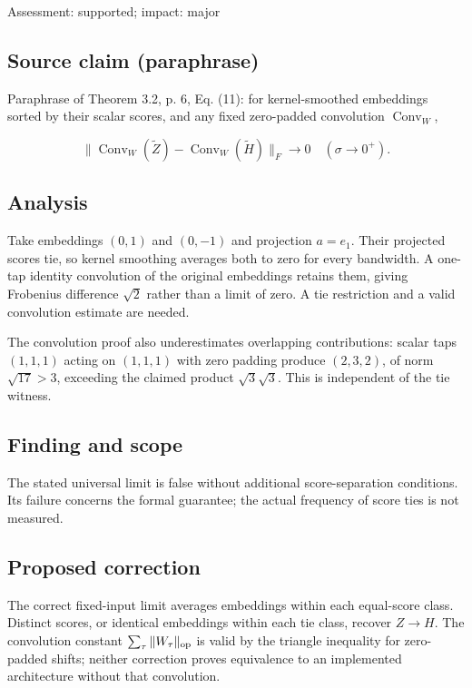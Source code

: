 \documentclass[11pt]{article}
\begin{document}
Assessment: supported; impact: major

\subsection*{Source claim (paraphrase)}

Paraphrase of Theorem 3.2, p. 6, Eq. (11): for kernel-smoothed embeddings sorted by their scalar scores, and any fixed zero-padded convolution \(\operatorname{Conv}_W\),

\[ \|\operatorname{Conv}_W(\widetilde Z)-\operatorname{Conv}_W(\widetilde H)\|_F\to0 \quad(\sigma\to0^+). \]

\subsection*{Analysis}

Take embeddings \((0,1)\) and \((0,-1)\) and projection \(a=e_1\). Their projected scores tie, so kernel smoothing averages both to zero for every bandwidth. A one-tap identity convolution of the original embeddings retains them, giving Frobenius difference \(\sqrt2\) rather than a limit of zero. A tie restriction and a valid convolution estimate are needed.

The convolution proof also underestimates overlapping contributions: scalar taps \((1,1,1)\) acting on \((1,1,1)\) with zero padding produce \((2,3,2)\), of norm \(\sqrt{17}>3\), exceeding the claimed product \(\sqrt3\sqrt3\). This is independent of the tie witness.

\subsection*{Finding and scope}

The stated universal limit is false without additional score-separation conditions. Its failure concerns the formal guarantee; the actual frequency of score ties is not measured.

\subsection*{Proposed correction}

The correct fixed-input limit averages embeddings within each equal-score class. Distinct scores, or identical embeddings within each tie class, recover \(Z\to H\). The convolution constant \(\sum_\tau\|W_\tau\|_{\rm op}\) is valid by the triangle inequality for zero-padded shifts; neither correction proves equivalence to an implemented architecture without that convolution.
\end{document}
